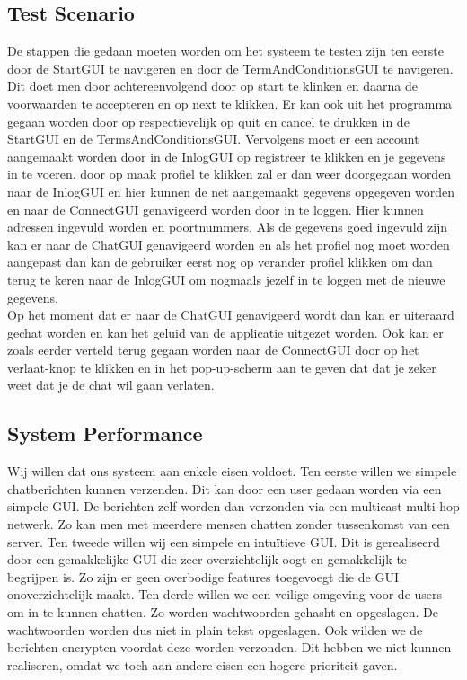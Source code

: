 \documentclass[12pt]{article}
\begin{document}
\subsection{Test Scenario}
De stappen die gedaan moeten worden om het systeem te testen zijn ten eerste door de StartGUI te navigeren en door de TermAndConditionsGUI te navigeren. Dit doet men door achtereenvolgend door op start te klinken en daarna de voorwaarden te accepteren en op next te klikken. Er kan ook uit het programma gegaan worden door op respectievelijk op quit en cancel te drukken in de StartGUI en de TermsAndConditionsGUI. Vervolgens moet er een account aangemaakt worden door in de InlogGUI op registreer te klikken en je gegevens in te voeren. door op maak profiel te klikken zal er dan weer doorgegaan worden naar de InlogGUI en hier kunnen de net aangemaakt gegevens opgegeven worden en naar de ConnectGUI genavigeerd worden door in te loggen. Hier kunnen adressen ingevuld worden en poortnummers. Als de gegevens goed ingevuld zijn kan er naar de ChatGUI genavigeerd worden en als het profiel nog moet worden aangepast dan kan de gebruiker eerst nog op verander profiel klikken om dan terug te keren naar de InlogGUI om nogmaals jezelf in te loggen met de nieuwe gegevens. \\

\noindent Op het moment dat er naar de ChatGUI genavigeerd wordt dan kan er uiteraard gechat worden en kan het geluid van de applicatie uitgezet worden. Ook kan er zoals eerder verteld terug gegaan worden naar de ConnectGUI door op het verlaat-knop te klikken en in het pop-up-scherm aan te geven dat dat je zeker weet dat je de chat wil gaan verlaten.

\subsection{System Performance}
Wij willen dat ons systeem aan enkele eisen voldoet. Ten eerste willen we simpele chatberichten kunnen verzenden. Dit kan door een user gedaan worden via een simpele GUI. De berichten zelf worden dan verzonden via een multicast multi-hop netwerk. Zo kan men met meerdere mensen chatten zonder tussenkomst van een server. Ten tweede willen wij een simpele en intuïtieve GUI. Dit is gerealiseerd door een gemakkelijke GUI die zeer overzichtelijk oogt en gemakkelijk te begrijpen is. Zo zijn er geen overbodige features toegevoegt die de GUI onoverzichtelijk maakt. Ten derde willen we een veilige omgeving voor de users om in te kunnen chatten. Zo worden wachtwoorden gehasht en opgeslagen. De wachtwoorden worden dus niet in plain tekst opgeslagen. Ook wilden we de berichten encrypten voordat deze worden verzonden. Dit hebben we niet kunnen realiseren, omdat we toch aan andere eisen een hogere prioriteit gaven. 
\end{document}
